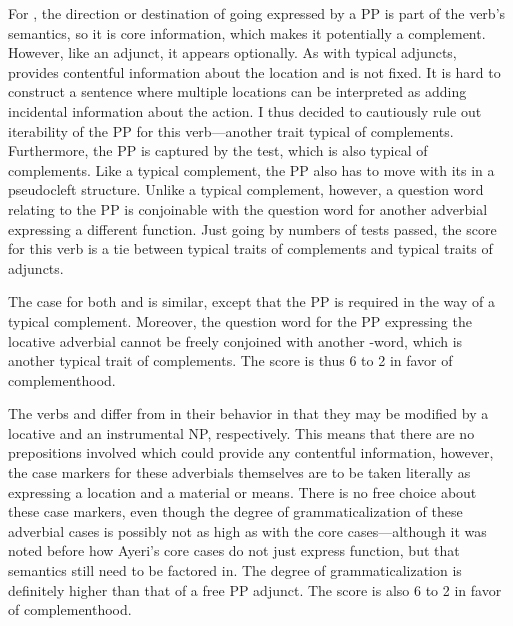For , the direction or destination of going expressed by a
PP is part of the verb's semantics, so it is core information, which makes it
potentially a complement. However, like an adjunct, it appears optionally.
As with typical adjuncts,  provides contentful information about
the location and is not fixed. It is hard to construct a sentence where
multiple locations can be interpreted as adding incidental information about
the action. I thus decided to cautiously rule out iterability of the PP for
this verb---another trait typical of complements. Furthermore, the PP is
captured by the  test, which is also typical of complements. Like a
typical complement, the PP also has to move with its
 in a pseudocleft structure. Unlike a typical complement, however, a
question word relating to the PP is conjoinable with the question word for
another adverbial expressing a different function. Just going by numbers of
tests passed, the score for this verb is a tie between typical traits of
complements and typical traits of adjuncts.

The case for both  and  is
similar, except that the PP is required in the way of a typical complement.
Moreover, the question word for the PP expressing the locative adverbial cannot
be freely conjoined with another -word, which is another typical trait
of complements. The score is thus 6 to 2 in favor of complementhood.

The verbs  and  differ from
 in their behavior in that they may be modified by a
locative and an instrumental NP, respectively. This means that there are no
prepositions involved which could provide any contentful information, however,
the case markers for these adverbials themselves are to be taken literally as
expressing a location and a material or means. There is no free choice about
these case markers, even though the degree of grammaticalization of these
adverbial cases is possibly not as high as with the core cases---although it
was noted before how Ayeri's core cases do not just express function, but that
semantics still need to be factored in. The degree of grammaticalization is
definitely higher than that of a free PP adjunct. The score is also 6 to 2 in
favor of complementhood.

